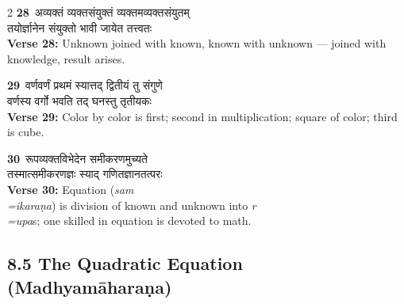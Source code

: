 \documentclass[11pt,a4paper]{article}
\newcommand{\dev}[1]{{\devanagarifont #1}}
\newcommand{\iast}[1]{\textit{#1}}
\newcommand{\vnum}[1]{\textcolor{versenumbercolor}{\textbf{#1}}}
\begin{document}
\begin{paracol}{2}
\switchcolumn[0]
\vnum{28}\ \dev{अव्यक्तं व्यक्तसंयुक्तं व्यक्तमव्यक्तसंयुतम्}\\
\dev{तयोर्ज्ञानेन संयुक्तो भावी जायेत तत्त्वतः}\\
\switchcolumn[1]
\textbf{Verse 28:} Unknown joined with known, known with unknown --- joined with knowledge, result arises.

\switchcolumn[0]
\vnum{29}\ \dev{वर्णवर्णं प्रथमं स्यात्तद् द्वितीयं तु संगुणे}\\
\dev{वर्णस्य वर्गो भवति तद् घनस्तु तृतीयकः}\\
\switchcolumn[1]
\textbf{Verse 29:} Color by color is first; second in multiplication; square of color; third is cube.

\switchcolumn[0]
\vnum{30}\ \dev{रूपव्यक्तविभेदेन समीकरणमुच्यते}\\
\dev{तस्मात्समीकरणज्ञः स्याद् गणितज्ञानतत्परः}\\
\switchcolumn[1]
\textbf{Verse 30:} Equation (\iast{sam\\=ikara\d na}) is division of known and unknown into \iast{r\\=upa}s; one skilled in equation is devoted to math.

\end{paracol}

\subsection*{8.5 The Quadratic Equation (Madhyam\=ahara\d na)}
\label{sec:8.5}

\begin{center}
\end{center}
\end{document}
